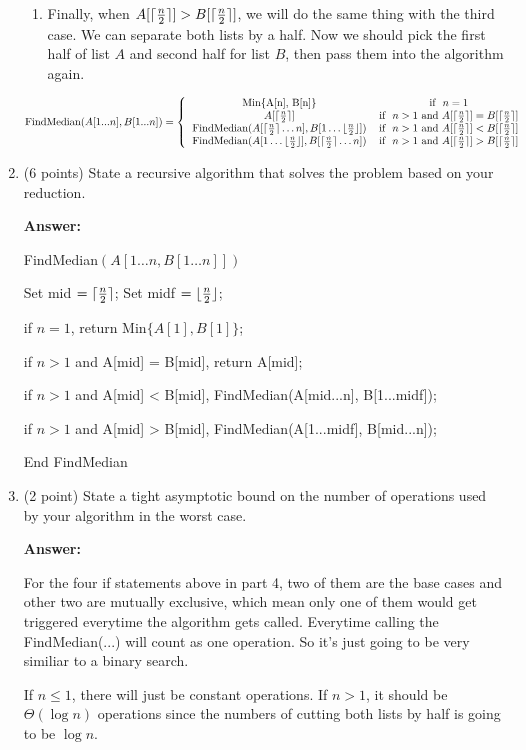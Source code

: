 \documentclass[paper=a4, fontsize=11pt]{scrartcl}
\DeclarePairedDelimiter\floor{\lfloor}{\rfloor}
\DeclarePairedDelimiter\ceil{\lceil}{\rceil}
\newcommand\tab[1][0.6cm]{\hspace*{#1}}
\numberwithin{equation}{section}		%
\numberwithin{figure}{section}			%
\numberwithin{table}{section}				%
\begin{document}
\begin{enumerate}
\begin{enumerate}
	\item Finally, when $A[\ceil{\frac{n}{2}}] > B[\ceil{\frac{n}{2}}]$, we will do the same thing with the third case. We can separate both lists by a half. Now we should pick the first half of list $A$ and second half for list $B$, then pass them into the algorithm again.
\end{enumerate}

\[
\text{FindMedian}(A[1...n], B[1...n]) = \left\{
\begin{tabular}{cc}
Min\{A[n], B[n]\} & \text{if } $n = 1$ \\
$A[\ceil{\frac{n}{2}}]$ & \text{if } $n>1$ and $A[\ceil{\frac{n}{2}}] = B[\ceil{\frac{n}{2}}]$ \\
FindMedian$(A[\ceil{\frac{n}{2}}\dots n],B[1\dots \floor{\frac{n}{2}}])$ & \text{if } $n>1$ and $A[\ceil{\frac{n}{2}}] < B[\ceil{\frac{n}{2}}]$ \\
FindMedian$(A[1\dots \floor{\frac{n}{2}}],B[\ceil{\frac{n}{2}}\dots n])$ & \text{if } $n>1$ and $A[\ceil{\frac{n}{2}}] > B[\ceil{\frac{n}{2}}]$ \\
\end{tabular}\right.
\]


\item (6 points) State a recursive algorithm that solves the problem based on your reduction.

\textbf{Answer:}

FindMedian$(A[1\dots n, B[1\dots n]])$

\tab Set mid $= \ceil{\frac{n}{2}}$; Set midf $= \floor{\frac{n}{2}}$;

\tab if $n = 1$, return Min$\{A[1], B[1]\}$;

\tab if $n>1$ and A[mid] = B[mid], return A[mid];

\tab if $n>1$ and A[mid] < B[mid], FindMedian(A[mid...n], B[1...midf]);

\tab if $n>1$ and A[mid] > B[mid], FindMedian(A[1...midf], B[mid...n]);

End FindMedian


\item (2 point) State a tight asymptotic bound on the number of operations used by your algorithm in the worst case.

\textbf{Answer:}

For the four if statements above in part 4, two of them are the base cases and other two are mutually exclusive, which mean only one of them would get triggered everytime the algorithm gets called. Everytime calling the FindMedian(...) will count as one operation. So it's just going to be very similiar to a binary search. 

If $n \leq 1$, there will just be constant operations. If $n>1$, it should be $\Theta(\log n)$ operations since the numbers of cutting both lists by half is going to be $\log n$.




\end{enumerate}
\end{document}

